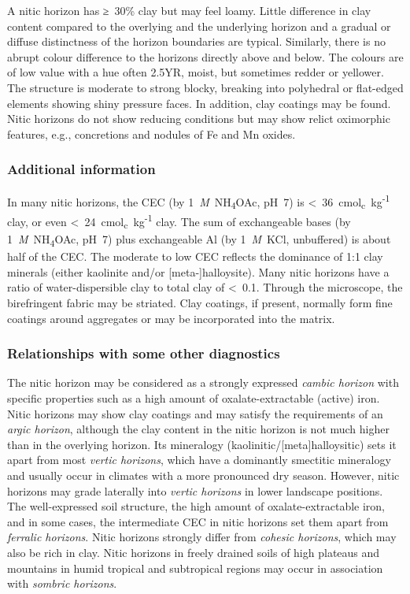 \documentclass[
  letterpaper,
  DIV=11,
  numbers=noendperiod]{scrreprt}
\begin{document}
A nitic horizon has ≥~30\% clay but may feel loamy. Little difference in
clay content compared to the overlying and the underlying horizon and a
gradual or diffuse distinctness of the horizon boundaries are typical.
Similarly, there is no abrupt colour difference to the horizons directly
above and below. The colours are of low value with a hue often 2.5YR,
moist, but sometimes redder or yellower. The structure is moderate to
strong blocky, breaking into polyhedral or flat-edged elements showing
shiny pressure faces. In addition, clay coatings may be found. Nitic
horizons do not show reducing conditions but may show relict oximorphic
features, e.g., concretions and nodules of Fe and Mn oxides.

\hypertarget{additional-information-11}{%
\subsubsection{Additional information}\label{additional-information-11}}

In many nitic horizons, the CEC (by 1~\emph{M}~NH\textsubscript{4}OAc,
pH~7) is \textless~36~cmol\textsubscript{c}~kg\textsuperscript{-1} clay,
or even \textless~24~cmol\textsubscript{c}~kg\textsuperscript{-1} clay.
The sum of exchangeable bases (by 1~\emph{M}~NH\textsubscript{4}OAc,
pH~7) plus exchangeable Al (by 1~\emph{M}~KCl, unbuffered) is about half
of the CEC. The moderate to low CEC reflects the dominance of 1:1 clay
minerals (either kaolinite and/or {[}meta-{]}halloysite). Many nitic
horizons have a ratio of water-dispersible clay to total clay of
\textless~0.1. Through the microscope, the birefringent fabric may be
striated. Clay coatings, if present, normally form fine coatings around
aggregates or may be incorporated into the matrix.

\hypertarget{relationships-with-some-other-diagnostics-21}{%
\subsubsection{Relationships with some other
diagnostics}\label{relationships-with-some-other-diagnostics-21}}

The nitic horizon may be considered as a strongly expressed \emph{cambic
horizon} with specific properties such as a high amount of
oxalate-extractable (active) iron. Nitic horizons may show clay coatings
and may satisfy the requirements of an \emph{argic horizon}, although
the clay content in the nitic horizon is not much higher than in the
overlying horizon. Its mineralogy (kaolinitic/{[}meta{]}halloysitic)
sets it apart from most \emph{vertic horizons}, which have a dominantly
smectitic mineralogy and usually occur in climates with a more
pronounced dry season. However, nitic horizons may grade laterally into
\emph{vertic horizons} in lower landscape positions. The well-expressed
soil structure, the high amount of oxalate-extractable iron, and in some
cases, the intermediate CEC in nitic horizons set them apart from
\emph{ferralic horizons}. Nitic horizons strongly differ from
\emph{cohesic horizons}, which may also be rich in clay. Nitic horizons
in freely drained soils of high plateaus and mountains in humid tropical
and subtropical regions may occur in association with \emph{sombric
horizons}.
\end{document}
